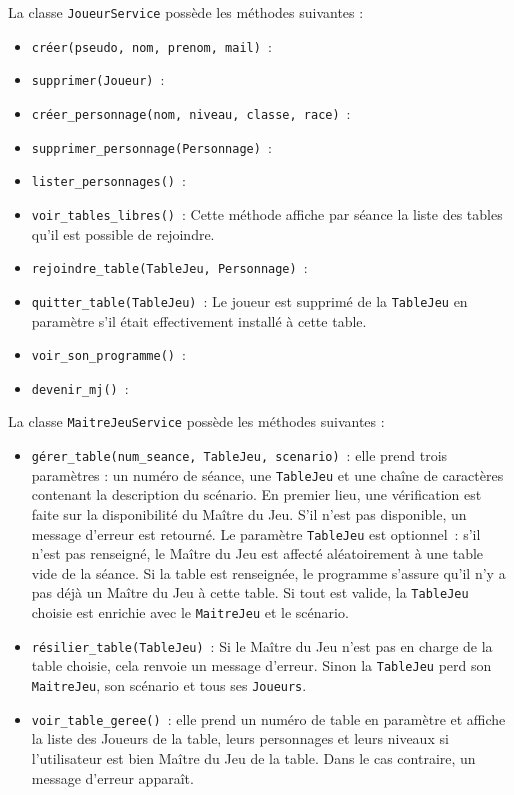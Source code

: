 \documentclass[11pt]{article}
\begin{document}
\bigbreak

La classe \texttt{JoueurService} possède les méthodes suivantes :
\begin{itemize}[label=, font=\small]
    \item \texttt{créer(pseudo, nom, prenom, mail)}~: 
    \item \texttt{supprimer(Joueur)}~: 
    \item \texttt{créer\_personnage(nom, niveau, classe, race)}~: 
    \item \texttt{supprimer\_personnage(Personnage)}~: 
    \item \texttt{lister\_personnages()}~: 
    \item \texttt{voir\_tables\_libres()}~: Cette méthode affiche par séance la liste des tables qu'il est possible de rejoindre.
    \item \texttt{rejoindre\_table(TableJeu, Personnage)}~: 
    \item \texttt{quitter\_table(TableJeu)}~: Le joueur est supprimé de la \texttt{TableJeu} en paramètre s'il était effectivement installé à cette table.
    \item \texttt{voir\_son\_programme()}~:
    \item \texttt{devenir\_mj()}~:
\end{itemize}


\bigbreak


La classe \texttt{MaitreJeuService} possède les méthodes suivantes :

\begin{itemize}[label=, font=\small]
    \item \texttt{gérer\_table(num_seance, TableJeu, scenario)}~: elle prend trois paramètres : un numéro de séance, une \texttt{TableJeu} et une chaîne de caractères contenant la description du scénario. En premier lieu, une vérification est faite sur la disponibilité du Maître du Jeu. S'il n'est pas disponible, un message d'erreur est retourné. Le paramètre \texttt{TableJeu} est optionnel~: s'il n'est pas renseigné, le Maître du Jeu est affecté aléatoirement à une table vide de la séance. Si la table est renseignée, le programme s'assure qu'il n'y a pas déjà un Maître du Jeu à cette table. Si tout est valide, la \texttt{TableJeu} choisie est enrichie avec le \texttt{MaitreJeu} et le scénario.
    
    \item \texttt{résilier\_table(TableJeu)}~: Si le Maître du Jeu n'est pas en charge de la table choisie, cela renvoie un message d'erreur. Sinon la \texttt{TableJeu} perd son \texttt{MaitreJeu}, son scénario et tous ses \texttt{Joueurs}.
    
    \item \texttt{voir\_table\_geree()}~: elle prend un numéro de table en paramètre et affiche la liste des Joueurs de la table, leurs personnages et leurs niveaux si l'utilisateur est bien Maître du Jeu de la table. Dans le cas contraire, un message d'erreur apparaît.
\end{itemize}
\end{document}
